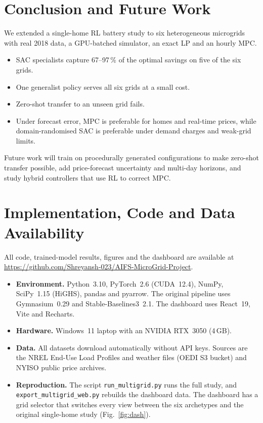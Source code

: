 \documentclass[conference]{IEEEtran}
\begin{document}
\section{Conclusion and Future Work}
We extended a single-home RL battery study to six heterogeneous microgrids with
real 2018 data, a GPU-batched simulator, an exact LP and an hourly MPC.
\begin{itemize}
\item SAC specialists capture 67--97\,\% of the optimal savings on five of the six grids.
\item One generalist policy serves all six grids at a small cost.
\item Zero-shot transfer to an unseen grid fails.
\item Under forecast error, MPC is preferable for homes and real-time prices, while domain-randomised SAC is preferable under demand charges and weak-grid limits.
\end{itemize}
Future work will train on procedurally generated configurations to make
zero-shot transfer possible, add price-forecast uncertainty and multi-day horizons,
and study hybrid controllers that use RL to correct MPC.

\section*{Implementation, Code and Data Availability}
All code, trained-model results, figures and the dashboard are available at
\url{https://github.com/Shreyansh-023/AIFS-MicroGrid-Project}.
\begin{itemize}
\item \textbf{Environment.} Python~3.10, PyTorch~2.6 (CUDA~12.4), NumPy, SciPy~1.15 (HiGHS), pandas and pyarrow. The original pipeline uses Gymnasium~0.29 and Stable-Baselines3~2.1. The dashboard uses React~19, Vite and Recharts.
\item \textbf{Hardware.} Windows~11 laptop with an NVIDIA RTX~3050 (4\,GB).
\item \textbf{Data.} All datasets download automatically without API keys. Sources are the NREL End-Use Load Profiles and weather files (OEDI S3 bucket) and NYISO public price archives.
\item \textbf{Reproduction.} The script \texttt{run\_multigrid.py} runs the full study, and \texttt{export\_multigrid\_web.py} rebuilds the dashboard data. The dashboard has a grid selector that switches every view between the six archetypes and the original single-home study (Fig.~\ref{fig:dash}).
\end{itemize}
\end{document}
